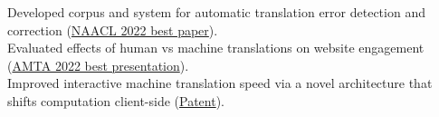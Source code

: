 Developed corpus and system for automatic translation error detection and correction (\href{https://aclanthology.org/2022.naacl-main.36.pdf}{NAACL 2022 best paper}).\\
Evaluated effects of human vs machine translations on website engagement (\href{https://aclanthology.org/2022.amta-research.23.pdf}{AMTA 2022 best presentation}).\\
Improved interactive machine translation speed via a novel architecture that shifts computation client-side (\href{https://patents.google.com/patent/US20230070302A1}{Patent}).\\
\fi

\vspace{-1mm}

